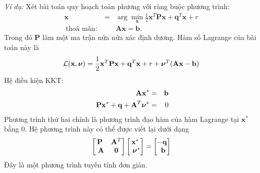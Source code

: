 \textit{Ví dụ:} Xét bài toán quy hoạch toàn phương với ràng buộc phương trình:
\begin{eqnarray}
\nonumber
\mathbf{x} &=& \arg \min_{\mathbf{x}} \frac{1}{2}\mathbf{x}^T\mathbf{Px} + \mathbf{q}^T\mathbf{x} + r  \\\
\text{thoả mãn:}~ && \mathbf{Ax} = \mathbf{b}.
\end{eqnarray}
Trong đó $\mathbf{P}$ làm một ma trận nửa nửa xác định dương. Hàm số Lagrange của bài
toán này là
\begin{equation*}
\mathcal{L}(\mathbf{x}, \boldsymbol{\nu}) = \frac{1}{2}\mathbf{x}^T\mathbf{Px} + \mathbf{q}^T\mathbf{x} + r  + \boldsymbol{\nu}^T(\mathbf{Ax} - \mathbf{b})
\end{equation*}
Hệ điều kiện KKT:
\begin{eqnarray}
\mathbf{Ax}^* &=& \mathbf{b} \\\
\mathbf{P}\mathbf{x}^* + \mathbf{q} + \mathbf{A}^T\boldsymbol{\nu}^* &=& 0
\end{eqnarray}
Phương trình thứ hai chính là phương trình đạo hàm của hàm Lagrange tại
$\mathbf{x}^*$ bằng 0. Hệ phương trình này có thể được viết lại dưới dạng
\begin{equation*}
\left[\begin{matrix}
\mathbf{P} & \mathbf{A}^T \\\
\mathbf{A} & \mathbf{0}
\end{matrix}\right]
\left[\begin{matrix}
\mathbf{x}^* \\\
\boldsymbol{\nu}^*
\end{matrix}\right]
=
\left[\begin{matrix}
-\mathbf{q} \\\
\mathbf{b}
\end{matrix}\right]
\end{equation*}
Đây là một phương trình tuyến tính đơn giản.

